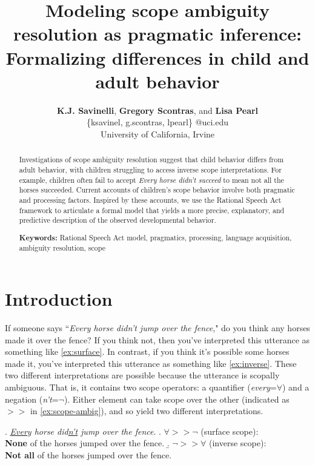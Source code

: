 \documentclass[10pt,a4paper]{article}
\title{Modeling scope ambiguity resolution as pragmatic inference:\\ 
Formalizing differences in child and adult behavior}
\author{\large \textbf{K.J. Savinelli}, \textbf{Gregory Scontras}, and \textbf{Lisa Pearl}\\
\{ksavinel, g.scontras, lpearl\} @uci.edu\\
University of California, Irvine}
\begin{document}
\maketitle

\begin{abstract}
Investigations of scope ambiguity resolution suggest that child behavior differs from adult behavior, with children struggling to access inverse scope interpretations. For example, children often fail to accept \textit{Every horse didn't succeed} to mean not all the horses succeeded. Current accounts of children's scope behavior involve both pragmatic and processing factors.
Inspired by these accounts, we use the Rational Speech Act framework to articulate a formal model that yields a more precise, explanatory, and predictive description of the observed developmental behavior.


\textbf{Keywords:} 
Rational Speech Act model, pragmatics, processing, language acquisition, ambiguity resolution, scope

\end{abstract}

\section{Introduction}

If someone says ``\textit{Every horse didn't jump over the fence}," do you think any horses made it over the fence? If you think not, then you've interpreted this utterance as something like  \ref{ex:surface}.
In contrast, if you think it's possible some horses made it, you've interpreted this utterance as something like \ref{ex:inverse}.
These two different interpretations are possible because the utterance is  scopally ambiguous. That is, it contains two scope operators: a quantifier (\textit{every}=$\forall$) and a negation (\textit{n't}=$\neg$).  Either element can take scope over the other (indicated as $>>$ in \ref{ex:scope-ambig}), and so yield two different interpretations. 

\ex. \label{ex:scope-ambig} \textit{\underline{Every} horse did\underline{n't} jump over the fence}.
\a.  \label{ex:surface} $\forall>>\neg$ (surface scope): \\
\textbf{None} of the horses jumped over the fence.
\b.  \label{ex:inverse} $\neg>>\forall$ (inverse scope):\\ 
\textbf{Not all} of the horses jumped over the fence.
\end{document}
